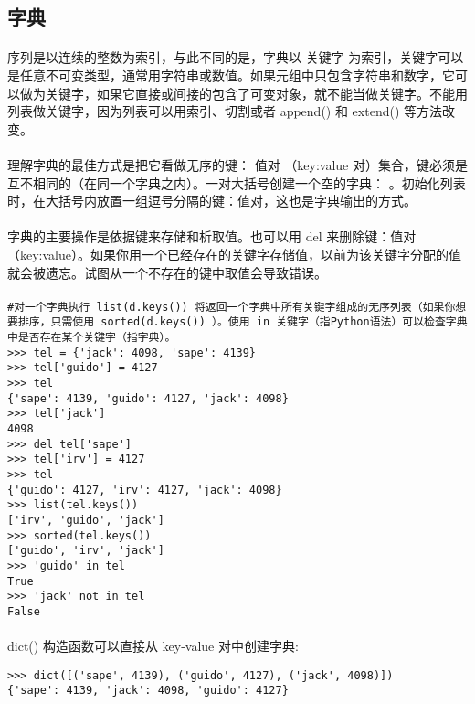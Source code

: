 \documentclass{article}
\begin{document}
\begin{CJK}{UTF8}{gbsn}
\section{字典}
\paragraph{}
序列是以连续的整数为索引，与此不同的是，字典以 关键字 为索引，关键字可以是任意不可变类型，通常用字符串或数值。如果元组中只包含字符串和数字，它可以做为关键字，如果它直接或间接的包含了可变对象，就不能当做关键字。不能用列表做关键字，因为列表可以用索引、切割或者 append() 和 extend() 等方法改变。
\paragraph{}
理解字典的最佳方式是把它看做无序的键： 值对 （key:value 对）集合，键必须是互不相同的（在同一个字典之内）。一对大括号创建一个空的字典： {} 。初始化列表时，在大括号内放置一组逗号分隔的键：值对，这也是字典输出的方式。
\paragraph{}
字典的主要操作是依据键来存储和析取值。也可以用 del 来删除键：值对（key:value）。如果你用一个已经存在的关键字存储值，以前为该关键字分配的值就会被遗忘。试图从一个不存在的键中取值会导致错误。
\paragraph{}
\begin{verbatim}
#对一个字典执行 list(d.keys()) 将返回一个字典中所有关键字组成的无序列表（如果你想要排序，只需使用 sorted(d.keys()) ）。使用 in 关键字（指Python语法）可以检查字典中是否存在某个关键字（指字典）。
>>> tel = {'jack': 4098, 'sape': 4139}
>>> tel['guido'] = 4127
>>> tel
{'sape': 4139, 'guido': 4127, 'jack': 4098}
>>> tel['jack']
4098
>>> del tel['sape']
>>> tel['irv'] = 4127
>>> tel
{'guido': 4127, 'irv': 4127, 'jack': 4098}
>>> list(tel.keys())
['irv', 'guido', 'jack']
>>> sorted(tel.keys())
['guido', 'irv', 'jack']
>>> 'guido' in tel
True
>>> 'jack' not in tel
False
\end{verbatim}
\paragraph{}
dict() 构造函数可以直接从 key-value 对中创建字典:
\begin{verbatim}
>>> dict([('sape', 4139), ('guido', 4127), ('jack', 4098)])
{'sape': 4139, 'jack': 4098, 'guido': 4127}
\end{verbatim}

\end{CJK}
\end{document}
